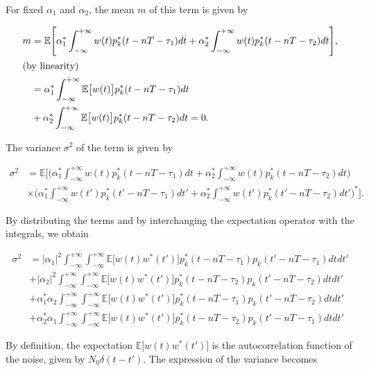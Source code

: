 \documentclass [a4paper, 11pt] {article}
\begin{document}
\begin{solution}
\begin{enumerate}
For fixed $\alpha_1$ and $\alpha_2$, the mean $m$ of this term is given by 

\begin{align}
    m &= \mathbb{E}\Bigg[\alpha^*_1 \int_{-\infty}^{+\infty} w(t)p_k^*(t-nT-\tau_{1})dt + \alpha^*_2 \int_{-\infty}^{+\infty} w(t)p_k^*(t-nT-\tau_{2})dt \Bigg],\\ \intertext{(by linearity)}
    &= \alpha^*_1 \int_{-\infty}^{+\infty} \mathbb{E}\big[w(t)\big]p_k^*(t-nT-\tau_{1})dt \\
    &+ \alpha^*_2 \int_{-\infty}^{+\infty} \mathbb{E}\big[w(t)\big]p_k^*(t-nT-\tau_{2})dt = 0. \nonumber
\end{align}

The variance $\sigma^2$ of the term is given by

\begin{align}
\sigma^2 &= \mathbb{E}\Bigg[\bigg(\alpha^*_1 \int_{-\infty}^{+\infty} w(t)p_k^*(t-nT-\tau_{1})dt + \alpha^*_2 \int_{-\infty}^{+\infty} w(t)p_k^*(t-nT-\tau_{2})dt\bigg) \\
& \times \bigg( \alpha^*_1 \int_{-\infty}^{+\infty} w(t')p_k^*(t'-nT-\tau_{1})dt' + \alpha^*_2 \int_{-\infty}^{+\infty} w(t')p_k^*(t'-nT-\tau_{2})dt'\bigg)^*\bigg].\nonumber
\end{align}

By distributing the terms and by interchanging the expectation operator with the integrals, we obtain

\begin{align}
\sigma^2 &= |\alpha_1|^2 \int_{-\infty}^{+\infty}\int_{-\infty}^{+\infty}\mathbb{E}\big[w(t)w^*(t')\big]p_k^*(t-nT-\tau_{1})p_k(t'-nT-\tau_{1})dtdt' \\
&+ |\alpha_2|^2 \int_{-\infty}^{+\infty}\int_{-\infty}^{+\infty}\mathbb{E}\big[w(t)w^*(t')\big]p_k^*(t-nT-\tau_{2})p_k(t'-nT-\tau_{2})dtdt' \nonumber\\
&+ \alpha_1^*\alpha_2 \int_{-\infty}^{+\infty}\int_{-\infty}^{+\infty}\mathbb{E}\big[w(t)w^*(t')\big]p_k^*(t-nT-\tau_{1})p_k(t'-nT-\tau_{2})dtdt' \nonumber\\
&+ \alpha_2^*\alpha_1 \int_{-\infty}^{+\infty}\int_{-\infty}^{+\infty}\mathbb{E}\big[w(t)w^*(t')\big]p_k^*(t-nT-\tau_{2})p_k(t'-nT-\tau_{1})dtdt'\nonumber
\end{align}

By definition, the expectation $\mathbb{E}\big[w(t)w^*(t')\big]$ is the autocorrelation function of the noise, given by $N_0\delta(t-t')$. The expression of the variance becomes


\end{enumerate}
\end{solution}
\end{document}
